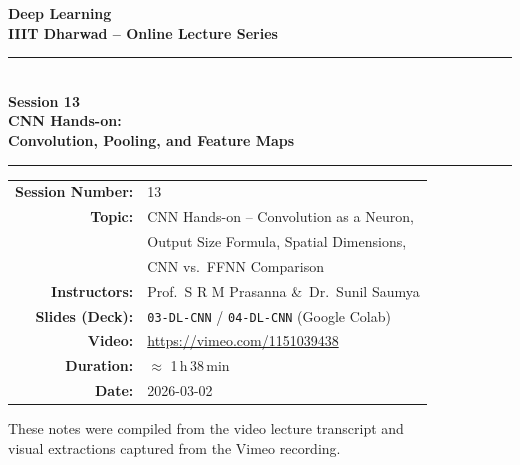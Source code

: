 \documentclass[12pt,a4paper]{article}
\begin{document}
\begin{titlepage}
  \centering
  \vspace*{2cm}
  {\LARGE\bfseries Deep Learning\\[0.4em]
   \large IIIT Dharwad -- Online Lecture Series\par}
  \vspace{1.5cm}
  \rule{\textwidth}{1.5pt}\\[0.4em]
  {\Huge\bfseries Session 13\\[0.5em]
   \Large CNN Hands-on:\\[0.3em]
   Convolution, Pooling, and Feature Maps}\\[0.4em]
  \rule{\textwidth}{1.5pt}
  \vspace{1.5cm}

  \begin{tabular}{rl}
    \textbf{Session Number:} & 13 \\[0.3em]
    \textbf{Topic:}          & CNN Hands-on -- Convolution as a Neuron, \\
                             & Output Size Formula, Spatial Dimensions, \\
                             & CNN vs.\ FFNN Comparison \\[0.3em]
    \textbf{Instructors:}    & Prof.\ S R M Prasanna \&\ Dr.\ Sunil Saumya \\[0.3em]
    \textbf{Slides (Deck):}  & \texttt{03-DL-CNN} / \texttt{04-DL-CNN} (Google Colab) \\[0.3em]
    \textbf{Video:}          & \url{https://vimeo.com/1151039438} \\[0.3em]
    \textbf{Duration:}       & $\approx$ 1\,h\,38\,min \\[0.3em]
    \textbf{Date:}           & 2026-03-02 \\
  \end{tabular}

  \vfill
  {\small These notes were compiled from the video lecture transcript and\\
  visual extractions captured from the Vimeo recording.}
\end{titlepage}

\tableofcontents
\newpage

\end{document}
